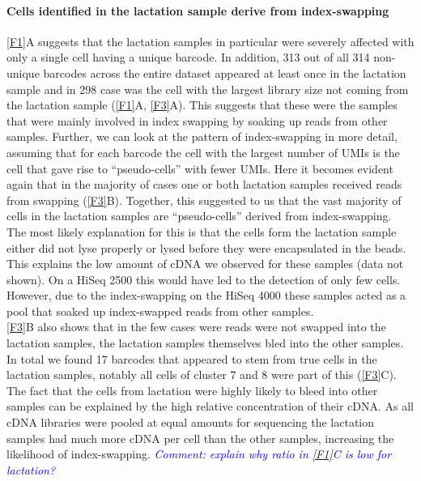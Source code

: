 \documentclass{article}
\newcommand{\comment}[1]{\textit{\textcolor{blue}{Comment: #1}}}
\begin{document}
\paragraph{Cells identified in the lactation sample derive from index-swapping}
\autoref{F1}A suggests that the lactation samples in particular were severely affected with only a single cell having a unique barcode.
In addition, 313 out of all 314 non-unique barcodes across the entire dataset appeared at least once in the lactation sample and in 298 case was the cell with the largest library size not coming from the lactation sample (\autoref{F1}A, \autoref{F3}A).
This suggests that these were the samples that were mainly involved in index swapping by soaking up reads from other samples.
Further, we can look at the pattern of index-swapping in more detail, assuming that for each barcode the cell with the largest number of UMIs is the cell that gave rise to ``pseudo-cells'' with fewer UMIs.
Here it becomes evident again that in the majority of cases one or both lactation samples received reads from swapping (\autoref{F3}B).
Together, this suggested to us that the vast majority of cells in the lactation samples are ``pseudo-cells'' derived from index-swapping.
The most likely explanation for this is that the cells form the lactation sample either did not lyse properly or lysed before they were encapsulated in the beads.
This explains the low amount of cDNA we observed for these samples (data not shown).
On a HiSeq 2500 this would have led to the detection of only few cells.
However, due to the index-swapping on the HiSeq 4000 these samples acted as a pool that soaked up index-swapped reads from other samples.\\
\autoref{F3}B also shows that in the few cases were reads were not swapped into the lactation samples, the lactation samples themselves bled into the other samples.
In total we found 17 barcodes that appeared to stem from true cells in the lactation samples, notably all cells of cluster 7 and 8 were part of this (\autoref{F3}C).
The fact that the cells from lactation were highly likely to bleed into other samples can be explained by the high relative concentration of their cDNA.
As all cDNA libraries were pooled at equal amounts for sequencing the lactation samples had much more cDNA per cell than the other samples, increasing the likelihood of index-swapping.
\comment{explain why ratio in \autoref{F1}C is low for lactation?}
\end{document}
